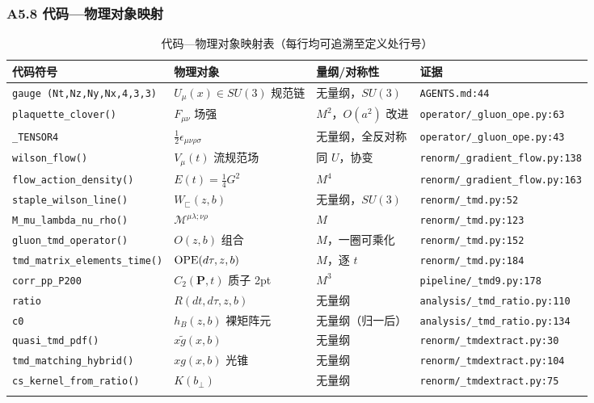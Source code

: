 \documentclass[UTF8]{ctexart}
\begin{document}
\subsubsection{A5.8 代码—物理对象映射}
\tiny
\begin{xltabular}{\textwidth}{lllX}
\toprule
代码符号 & 物理对象 & 量纲/对称性 & 证据 \\
\midrule
\endhead
\texttt{\nolinkurl{gauge (Nt,Nz,Ny,Nx,4,3,3)}} & $U_\mu(x)\in SU(3)$ 规范链 & 无量纲，$SU(3)$ & \texttt{\nolinkurl{AGENTS.md:44}} \\
\texttt{\nolinkurl{plaquette\_clover()}} & $F_{\mu\nu}$ 场强 & $M^2$，$O(a^2)$ 改进 & \texttt{\nolinkurl{operator/\_gluon\_ope.py:63}} \\
\texttt{\nolinkurl{\_TENSOR4}} & $\frac12\epsilon_{\mu\nu\rho\sigma}$ & 无量纲，全反对称 & \texttt{\nolinkurl{operator/\_gluon\_ope.py:43}} \\
\texttt{\nolinkurl{wilson\_flow()}} & $V_\mu(t)$ 流规范场 & 同 $U$，协变 & \texttt{\nolinkurl{renorm/\_gradient\_flow.py:138}} \\
\texttt{\nolinkurl{flow\_action\_density()}} & $E(t)=\frac14 G^2$ & $M^4$ & \texttt{\nolinkurl{renorm/\_gradient\_flow.py:163}} \\
\texttt{\nolinkurl{staple\_wilson\_line()}} & $W_\sqsubset(z,b)$ & 无量纲，$SU(3)$ & \texttt{\nolinkurl{renorm/\_tmd.py:52}} \\
\texttt{\nolinkurl{M\_mu\_lambda\_nu\_rho()}} & $\mathcal{M}^{\mu\lambda;\nu\rho}$ & $M$ & \texttt{\nolinkurl{renorm/\_tmd.py:123}} \\
\texttt{\nolinkurl{gluon\_tmd\_operator()}} & $O(z,b)$ 组合 & $M$，一圈可乘化 & \texttt{\nolinkurl{renorm/\_tmd.py:152}} \\
\texttt{\nolinkurl{tmd\_matrix\_elements\_time()}} & ${\rm OPE}(d\tau,z,b)$ & $M$，逐 $t$ & \texttt{\nolinkurl{renorm/\_tmd.py:184}} \\
\texttt{\nolinkurl{corr\_pp\_P200}} & $C_2(\mathbf{P},t)$ 质子 2pt & $M^3$ & \texttt{\nolinkurl{pipeline/\_tmd9.py:178}} \\
\texttt{\nolinkurl{ratio}} & $R(dt,d\tau,z,b)$ & 无量纲 & \texttt{\nolinkurl{analysis/\_tmd\_ratio.py:110}} \\
\texttt{\nolinkurl{c0}} & $h_B(z,b)$ 裸矩阵元 & 无量纲（归一后） & \texttt{\nolinkurl{analysis/\_tmd\_ratio.py:134}} \\
\texttt{\nolinkurl{quasi\_tmd\_pdf()}} & $x\tilde g(x,b)$ & 无量纲 & \texttt{\nolinkurl{renorm/\_tmdextract.py:30}} \\
\texttt{\nolinkurl{tmd\_matching\_hybrid()}} & $xg(x,b)$ 光锥 & 无量纲 & \texttt{\nolinkurl{renorm/\_tmdextract.py:104}} \\
\texttt{\nolinkurl{cs\_kernel\_from\_ratio()}} & $K(b_\perp)$ & 无量纲 & \texttt{\nolinkurl{renorm/\_tmdextract.py:75}} \\
\bottomrule
\caption{代码—物理对象映射表（每行均可追溯至定义处行号）}
\end{xltabular}
\end{document}
